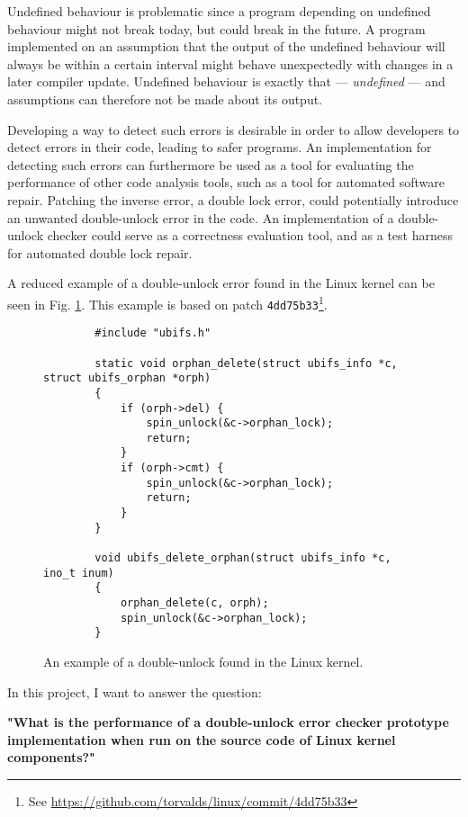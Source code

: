 \newpar Undefined behaviour is problematic since a program depending on undefined behaviour might not break today, but could break in the future. A program implemented on an assumption that the output of the undefined behaviour will always be within a certain interval might behave unexpectedly with changes in a later compiler update. Undefined behaviour is exactly that --- \textit{undefined} --- and assumptions can therefore not be made about its output.

\newpar Developing a way to detect such errors is desirable in order to allow developers to detect errors in their code, leading to safer programs. An implementation for detecting such errors can furthermore be used as a tool for evaluating the performance of other code analysis tools, such as a tool for automated software repair. Patching the inverse error, a double lock error, could potentially introduce an unwanted double-unlock error in the code. An implementation of a double-unlock checker could serve as a correctness evaluation tool, and as a test harness for automated double lock repair.

\newpar A reduced example of a double-unlock error found in the Linux kernel can be seen in Fig. \ref{fig:introexample}. This example is based on patch \texttt{4dd75b33}\footnote{See \url{https://github.com/torvalds/linux/commit/4dd75b33}}.

\begin{figure}[H]
    \centering
    \begin{verbatim}
        #include "ubifs.h"

        static void orphan_delete(struct ubifs_info *c, struct ubifs_orphan *orph)
        {
            if (orph->del) {
                spin_unlock(&c->orphan_lock);
                return;
            }
            if (orph->cmt) {
                spin_unlock(&c->orphan_lock);
                return;
            }
        }
        
        void ubifs_delete_orphan(struct ubifs_info *c, ino_t inum)
        {
            orphan_delete(c, orph);
            spin_unlock(&c->orphan_lock);
        }
    \end{verbatim}
    \caption{An example of a double-unlock found in the Linux kernel.}
    \label{fig:introexample}
\end{figure}
\newpar In this project, I want to answer the question:

\begin{center}
    \textbf{"What is the performance of a double-unlock error checker prototype implementation when run on the source code of Linux kernel components?"} 
\end{center}

